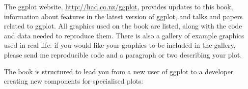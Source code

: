 
The ggplot website, \url{http://had.co.nz/ggplot}, provides updates to this book, information about features in the latest version of ggplot, and talks and papers related to ggplot.  All graphics used on the book are listed, along with the code and data needed to reproduce them.  There is also a gallery of example graphics used in real life: if you would like your graphics to be included in the gallery, please send me reproducible code and a paragraph or two describing your plot.

The book is structured to lead you from a new user of ggplot to a developer creating new components for specialised plots:

